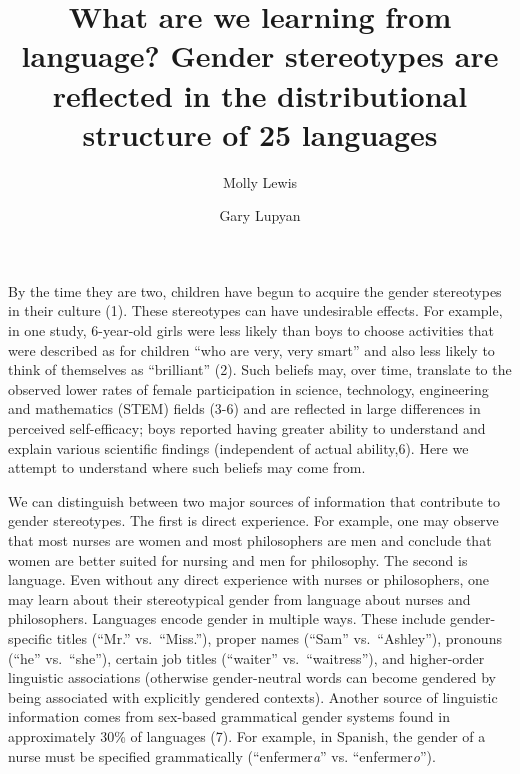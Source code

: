 \documentclass[9pt,twocolumn]{pnas-new}
\title{What are we learning from language? Gender stereotypes are reflected in the distributional structure of 25 languages}
\author[a,*]{Molly Lewis}
\author[b]{Gary Lupyan}
\affil[a]{Carnegie Mellon University, Psychology Department/Social and Decision Sciences, Pittsburgh, PA, USA}
\affil[b]{University of Wisconsin-Madison, Psychology Department, Madison, WI, USA}
\begin{document}
\maketitle
\thispagestyle{firststyle}


\let\thefootnote\relax{}

By the time they are two, children  have begun to acquire the
gender stereotypes in their culture (1). These
stereotypes can have undesirable effects. For example, in one study,
6-year-old girls were less likely than boys to choose activities that
were described as for children \enquote{who are very, very smart} and
also less likely to think of themselves as \enquote{brilliant}  (2). Such beliefs may, over time, translate to the observed lower rates of female participation in science, technology, engineering and mathematics (STEM) fields (3-6) and are reflected in large differences in perceived self-efficacy; boys reported having greater ability to understand and explain various scientific findings  (independent of actual ability,6).  Here we attempt to understand where such beliefs may come from.

We can distinguish between two major sources of information that contribute to gender stereotypes. The first is direct experience. For
example, one may observe that most nurses are women and most
philosophers are men and conclude that women are better suited for
nursing and men for philosophy. The second is language. Even without any
direct experience with nurses or philosophers, one may learn about their
stereotypical gender from language about nurses and philosophers.
Languages encode gender in multiple ways. These include gender-specific
titles (\enquote{Mr.} vs.\ \enquote{Miss.}), proper names (\enquote{Sam}
vs.\ \enquote{Ashley}), pronouns (\enquote{he} vs.\ \enquote{she}),
certain job titles (\enquote{waiter} vs.\ \enquote{waitress}), and
higher-order linguistic associations (otherwise gender-neutral words can
become gendered by being associated with explicitly gendered contexts).
Another source of linguistic information comes from sex-based
grammatical gender systems found in approximately 30\% of languages (7). For example, in Spanish, the gender of a
nurse must be specified grammatically (\enquote{enfermer\emph{a}} vs.
\enquote{enfermer\emph{o}}).
\end{document}
